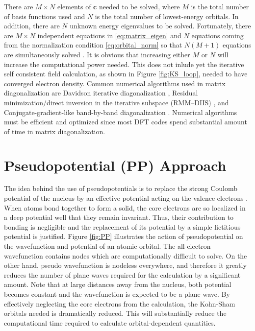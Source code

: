 There are $M \times N$ elements of $\bm{c}$ needed to be solved, where $M$ is the total number of basis functions used and $N$ is the total number of lowest-energy orbitals. In addition, there are $N$ unknown energy eigenvalues to be solved. Fortunately, there are $M \times N$ independent equations in \eqref{eq:matrix_eigen} and $N$ equations coming from the normalization condition \eqref{eq:orbital_norm} so that $N(M+1)$  equations are simultaneously solved \citep{Cottenier2013}. It is obvious that increasing either $M$ or $N$ will increase the computational power needed. This does not inlude yet the  iterative self consistent field calculation, as shown in Figure \ref{fig:KS_loop}, needed to have converged electron density. 
Common numerical algorithms used in matrix diagonalization are Davidson iterative diagonalization \citep{Davidson1975,Crouzeix1994}, Residual minimization/direct inversion in the iterative subspace (RMM–DIIS) \citep{Wood1985,Rayson2008}, and Conjugate-gradient-like band-by-band diagonalization \citep{Vorst1988,Kresse1996}. Numerical algorithms must be efficient and optimized since  most DFT codes spend substantial amount of time in matrix diagonalization.

\section{Pseudopotential (PP) Approach}
    The idea behind the use of pseudopotentials is to replace the strong Coulomb potential of the nucleus by an effective potential acting on the valence electrons \citep{Phillips1958,Phillips1959,Cohen1970}. When atoms bond together to form a solid, the core electrons are so localized in a deep potential well that they remain invariant. Thus, their contribution to bonding is negligible and the replacement of its potential by a simple fictitious potential is justified. Figure \ref{fig:PP} illustrates the action of pseudopotential on the wavefunction and potential of an atomic orbital. The all-electron wavefunction contains nodes which are  computationally difficult to  solve. On the other hand, pseudo wavefunction is nodeless everywhere, and therefore  it greatly reduces the number of plane waves required for the calculation by a significant amount. Note that at large distances away from the nucleus, both potential becomes constant and the wavefunction is expected to be a plane wave. By effectively neglecting the core electrons from the calculation, the Kohn-Sham orbitals needed is dramatically reduced. This will substantially reduce the computational time required to calculate orbital-dependent quantities.

